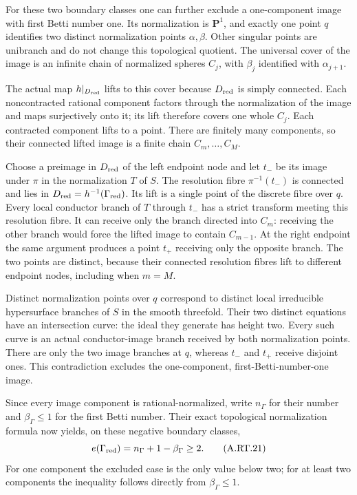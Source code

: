 For these two boundary classes one can further exclude a
one-component image with first Betti number one. Its normalization
is $\mathbf P^1$, and exactly one point $q$ identifies two distinct
normalization points $\alpha,\beta$. Other singular points are
unibranch and do not change this topological quotient. The universal
cover of the image is an infinite chain of normalized spheres $C_j$,
with $\beta_j$ identified with $\alpha_{j+1}$.

The actual map $h|_{D_{\rm red}}$ lifts to this cover because
$D_{\rm red}$ is simply connected. Each noncontracted rational
component factors through the normalization of the image and maps
surjectively onto it; its lift therefore covers one whole $C_j$.
Each contracted component lifts to a point. There are finitely many
components, so their connected lifted image is a finite chain
$C_m,\ldots,C_M$.

Choose a preimage in $D_{\rm red}$ of the left endpoint node and
let $t_-$ be its image under $\pi$ in the normalization $T$ of $S$.
The resolution fibre $\pi^{-1}(t_-)$ is connected and lies in
$D_{\rm red}=h^{-1}(\Gamma_{\rm red})$. Its lift is a single point
of the discrete fibre over $q$. Every local conductor branch of $T$
through $t_-$ has a strict transform meeting this resolution fibre.
It can receive only the branch directed into $C_m$: receiving the
other branch would force the lifted image to contain $C_{m-1}$.
At the right endpoint the same argument produces a point $t_+$
receiving only the opposite branch. The two points are distinct,
because their connected resolution fibres lift to different endpoint
nodes, including when $m=M$.

Distinct normalization points over $q$ correspond to distinct local
irreducible hypersurface branches of $S$ in the smooth threefold.
Their two distinct equations have an intersection curve: the ideal
they generate has height two. Every such curve is an actual
conductor-image branch received by both normalization points.
There are only the two image branches at $q$, whereas $t_-$ and
$t_+$ receive disjoint ones. This contradiction excludes the
one-component, first-Betti-number-one image.

Since every image component is rational-normalized, write
$n_\Gamma$ for their number and $\beta_\Gamma\le1$ for the
first Betti number. Their exact topological normalization
formula now yields, on these negative boundary classes,
\[
 e(\Gamma_{\rm red})=n_\Gamma+1-\beta_\Gamma\ge2.
 \tag{A.RT.21}\label{cdp:eq:A.RT.21}
\]
For one component the excluded case is the only value below
two; for at least two components the inequality follows
directly from $\beta_\Gamma\le1$.




